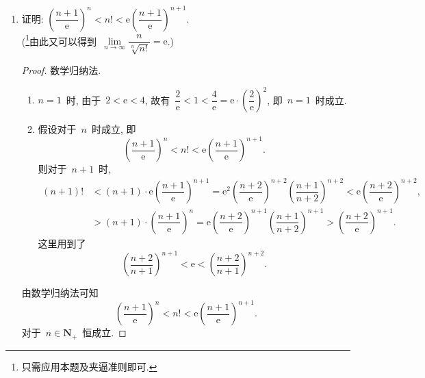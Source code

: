 \documentclass[UTF8,a4paper,10pt,twoside]{book}
\newcommand{\e}{\mathrm e}
\begin{document}
\begin{enumerate}
	\item 证明: $\left(\dfrac{n+1}{\e}\right)^n<n!<\e\left(\dfrac{n+1}{\e}\right)^{n+1}$.\\
	      (\footnote{只需应用本题及夹逼准则即可.}由此又可以得到~$\lim\limits_{n\to\infty} \dfrac{n}{\sqrt[n]{n!}}=\e$.)
	      \begin{proof}
		      数学归纳法.
		      \begin{enumerate}[(1)]
			      \item $n=1$~时, 由于~$2<\e<4$, 故有~$\dfrac{2}{\e}<1<\dfrac{4}{\e}=\e\cdot\left(\dfrac{2}{\e}\right)^2$, 即~$n=1$~时成立.
			      \item 假设对于~$n$~时成立, 即
			            \[
				            \left(\dfrac{n+1}{\e}\right)^n<n!<\e\left(\dfrac{n+1}{\e}\right)^{n+1}.
			            \]
			            则对于~$n+1$~时,
			            \[
				            \begin{split}
					            (n+1)!&<(n+1)\cdot\e\left(\dfrac{n+1}{\e}\right)^{n+1}
					            =\e^2\left(\dfrac{n+2}{\e}\right)^{n+2}\left(\dfrac{n+1}{n+2}\right)^{n+2}<\e\left(\dfrac{n+2}{\e}\right)^{n+2},\\
					            &>(n+1)\cdot\left(\dfrac{n+1}{\e}\right)^{n}
					            =\e\left(\dfrac{n+2}{\e}\right)^{n+1}\left(\dfrac{n+1}{n+2}\right)^{n+1}>\left(\dfrac{n+2}{\e}\right)^{n+1}.
				            \end{split}
			            \]
			            这里用到了
			            \[
				            \left(\dfrac{n+2}{n+1}\right)^{n+1}<\e<\left(\dfrac{n+2}{n+1}\right)^{n+2}.
			            \]
		      \end{enumerate}
		      由数学归纳法可知
		      \[
			      \left(\dfrac{n+1}{\e}\right)^n<n!<\e\left(\dfrac{n+1}{\e}\right)^{n+1}.
		      \]
		      对于~$n\in\mathbf{N}_{+}$~恒成立.\qedhere
	      \end{proof}


\end{enumerate}
\end{document}
